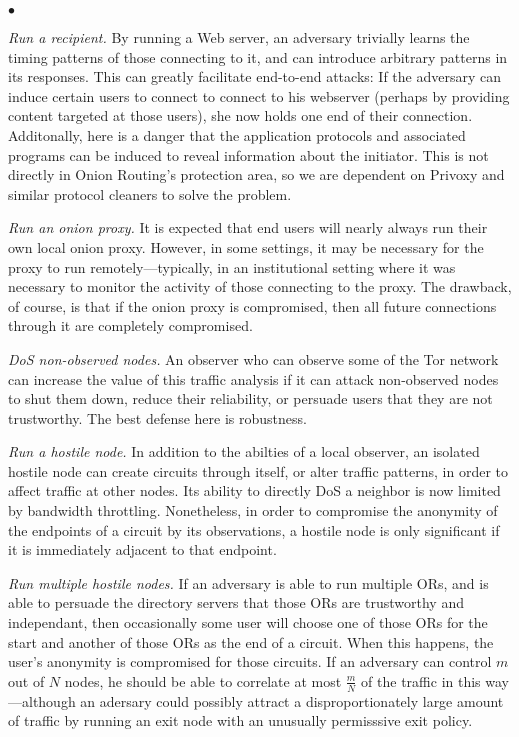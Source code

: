 \documentclass[times,10pt,twocolumn]{article}
\newenvironment{tightlist}{\begin{list}{$\bullet$}{
  \setlength{\itemsep}{0mm}
    \setlength{\parsep}{0mm}
    }}{\end{list}}
\begin{document}
\begin{tightlist}
  
\item \emph{Run a recipient.} By running a Web server, an adversary
  trivially learns the timing patterns of those connecting to it, and
  can introduce arbitrary patterns in its responses.  This can greatly
  facilitate end-to-end attacks: If the adversary can induce certain
  users to connect to connect to his webserver (perhaps by providing
  content targeted at those users), she now holds one end of their
  connection.  Additonally, here is a danger that the application
  protocols and associated programs can be induced to reveal
  information about the initiator.  This is not directly in Onion
  Routing's protection area, so we are dependent on Privoxy and
  similar protocol cleaners to solve the problem.
  
\item \emph{Run an onion proxy.} It is expected that end users will
  nearly always run their own local onion proxy. However, in some
  settings, it may be necessary for the proxy to run
  remotely---typically, in an institutional setting where it was
  necessary to monitor the activity of those connecting to the proxy.
  The drawback, of course, is that if the onion proxy is compromised,
  then all future connections through it are completely compromised.

\item \emph{DoS non-observed nodes.} An observer who can observe some
  of the Tor network can increase the value of this traffic analysis
  if it can attack non-observed nodes to shut them down, reduce
  their reliability, or persuade users that they are not trustworthy.
  The best defense here is robustness.
  
\item \emph{Run a hostile node.}  In addition to the abilties of a
  local observer, an isolated hostile node can create circuits through
  itself, or alter traffic patterns, in order to affect traffic at
  other nodes. Its ability to directly DoS a neighbor is now limited
  by bandwidth throttling. Nonetheless, in order to compromise the
  anonymity of the endpoints of a circuit by its observations, a
  hostile node is only significant if it is immediately adjacent to
  that endpoint. 
  
\item \emph{Run multiple hostile nodes.}  If an adversary is able to
  run multiple ORs, and is able to persuade the directory servers
  that those ORs are trustworthy and independant, then occasionally
  some user will choose one of those ORs for the start and another of
  those ORs as the end of a circuit.  When this happens, the user's
  anonymity is compromised for those circuits.  If an adversary can
  control $m$ out of $N$ nodes, he should be able to correlate at most 
  $\frac{m}{N}$ of the traffic in this way---although an adersary
  could possibly attract a disproportionately large amount of traffic
  by running an exit node with an unusually permisssive exit policy.


\end{tightlist}
\end{document}
